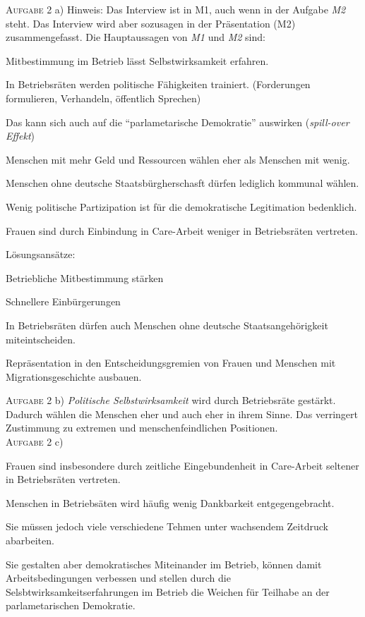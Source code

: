 \textsc{Aufgabe 2} a) \quad
Hinweis: Das Interview ist in M1, auch wenn in der Aufgabe \emph{M2} steht. 
Das Interview wird aber sozusagen in der Präsentation (M2) zusammengefasst. Die Hauptaussagen von \emph{M1} und \emph{M2} sind: 
\begin{myitemize}
    \item Mitbestimmung im Betrieb lässt Selbstwirksamkeit erfahren.
    \item In Betriebsräten werden politische Fähigkeiten trainiert. (Forderungen formulieren, Verhandeln, öffentlich Sprechen)
    \item Das kann sich auch auf die \enquote{parlametarische Demokratie} auswirken (\emph{spill-over Effekt})
    \item Menschen mit mehr Geld und Ressourcen wählen eher als Menschen mit wenig.
    \item Menschen ohne deutsche Staatsbürgherschasft dürfen lediglich kommunal wählen. %
    \item Wenig politische Partizipation ist für die demokratische Legitimation bedenklich. 
    \item Frauen sind durch Einbindung in Care-Arbeit weniger in Betriebsräten vertreten. 
    \item Lösungsansätze: 
    \begin{myitemize}
        \item Betriebliche Mitbestimmung stärken
        \item Schnellere Einbürgerungen 
        \item In Betriebsräten dürfen auch Menschen ohne deutsche Staatsangehörigkeit miteintscheiden. 
        \item Repräsentation in den Entscheidungsgremien von Frauen und Menschen mit Migrationsgeschichte ausbauen.
    \end{myitemize} 
\end{myitemize}



\textsc{Aufgabe 2} b) \quad
\emph{Politische Selbstwirksamkeit} wird durch Betriebsräte gestärkt. Dadurch wählen die Menschen eher und auch eher in ihrem Sinne. 
Das verringert Zustimmung zu extremen und menschenfeindlichen Positionen. 
\\

\textsc{Aufgabe 2} c) \quad
\begin{myitemize}
    \item Frauen sind insbesondere durch zeitliche Eingebundenheit in Care-Arbeit seltener in Betriebsräten vertreten.
    \item Menschen in Betriebsäten wird häufig wenig Dankbarkeit entgegengebracht.
    \item Sie müssen jedoch viele verschiedene Tehmen unter wachsendem Zeitdruck abarbeiten. 
    \item Sie gestalten aber demokratisches Miteinander im Betrieb, können damit Arbeitsbedingungen verbessen und stellen durch die Selsbtwirksamkeitserfahrungen im Betrieb die Weichen für Teilhabe an der parlametarischen Demokratie. 
\end{myitemize} 


